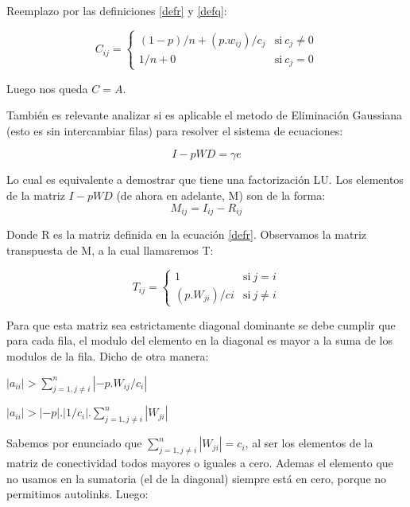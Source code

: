 Reemplazo por las definiciones \ref{defr} y \ref{defq}:

\begin{equation}
	\label{defc}
    C_{ij} = \left\{
            \begin{array}{ll}
                 (1-p)/n + (p.w_{ij})/c_j & \mathrm{si\ } c_j \neq 0 \\
                 1/n + 0                  & \mathrm{si\ } c_j = 0
            \end{array}
        \right.
\end{equation}

Luego nos queda $C=A$.

También es relevante analizar si es aplicable el metodo de Eliminación Gaussiana (esto es sin intercambiar filas) para resolver el sistema de ecuaciones:

\begin{equation}
    \label{defSistema}
    I - pWD = \gamma e
\end{equation}

Lo cual es equivalente a demostrar que tiene una factorización LU.     
Los elementos de la matriz $I - pWD$ (de ahora en adelante, M) son de la forma:
\begin{equation}
    \label{defMatriz}
    M_{ij} = I_{ij} - R_{ij}
\end{equation}

Donde R es la matriz definida en la ecuación \ref{defr}. Observamos la matriz transpuesta de M, a la cual llamaremos T:

\begin{equation}
    \label{defT}
    T_{ij} = \left\{
            \begin{array}{ll}
                 1 & \mathrm{si\ } j = i \\
                 (p.W_{ji})/ci & \mathrm{si\ } j \neq i 
            \end{array}
        \right.
\end{equation}

Para que esta matriz sea estrictamente diagonal dominante se debe cumplir que para cada fila, el modulo del elemento en la diagonal es mayor a la suma de los modulos de la fila. Dicho de otra manera:  


$   |a_{ii}| > \sum_{j = 1, j \neq i}^n |-p.W_{ij}/c_i| $
    
$   |a_{ii}| > |-p|.|1/c_i|. \sum_{j = 1, j \neq i}^n |W_{ji}|$

Sabemos por enunciado que $\sum_{j = 1, j \neq i}^n |W_{ji}| = c_i$, al ser los elementos de la matriz de conectividad todos mayores o iguales a cero. Ademas el elemento que no usamos en la sumatoria (el de la diagonal) siempre está en cero, porque no permitimos autolinks. Luego:



